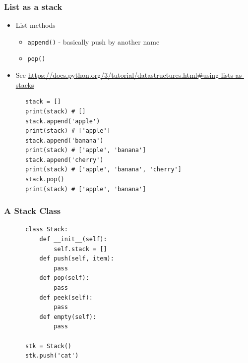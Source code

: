 \documentclass[10pt]{beamer}
\begin{document}
\begin{frame}[fragile]
  \frametitle{List as a stack}
   
   \begin{itemize}
       \item List methods
          \begin{itemize}
            \item \texttt{append()} - basically push by another name
            \item \texttt{pop()}
          \end{itemize}  
	   \item See \url{https://docs.python.org/3/tutorial/datastructures.html#using-lists-as-stacks}
	\end{itemize} 
	
	\begin{verbatim}
      stack = []
      print(stack) # []
      stack.append('apple')
      print(stack) # ['apple']
      stack.append('banana')
      print(stack) # ['apple', 'banana']
      stack.append('cherry')
      print(stack) # ['apple', 'banana', 'cherry']
      stack.pop()
      print(stack) # ['apple', 'banana']
    \end{verbatim}  
\end{frame}

\begin{frame}[fragile]
  \frametitle{A Stack Class}
   
  	
	\begin{verbatim}
	  class Stack:
          def __init__(self):
              self.stack = []
          def push(self, item):
              pass
          def pop(self):
              pass
          def peek(self):
              pass
          def empty(self):
              pass
              
      stk = Stack()
      stk.push('cat')        
    \end{verbatim}  
\end{frame}
\end{document}
